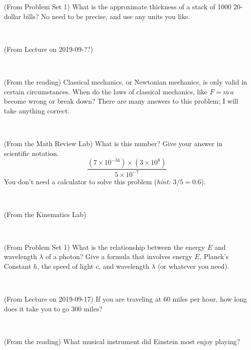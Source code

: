 \documentclass[12pt, letterpaper]{article}
\begin{document}
\begin{problem} (From Problem Set 1)
What is the approximate thickness of a stack of 1000 20-dollar bills?
No need to be precise, and use any units you like.
\end{problem}


\vfill ~

\begin{problem} (From Lecture on 2019-09-??)
\end{problem}


\vfill ~

\begin{problem} (From the reading)
Classical mechanics, or Newtonian mechanics, is only valid in certain
circumstances. When do the laws of classical mechanics, like $F =
m\,a$ become wrong or break down? There are many answers to this
problem; I will take anything correct.
\end{problem}


\vfill ~

\begin{problem} (From the Math Review Lab)
What is this number? Give your answer in scientific notation.
$$
\frac{(7\times10^{-34})\times(3\times10^8)}{5\times10^{-7}}
$$
You don't need a calculator to solve this problem (\textit{hint: $3/5=0.6$}).
\end{problem}


\vfill ~


\clearpage


\begin{problem} (From the Kinematics Lab)

\end{problem}


\vfill ~

\begin{problem} (From Problem Set 1)
What is the relationship between the energy $E$ and wavelength
$\lambda$ of a photon? Give a formula that involves energy $E$,
Planck's Constant $h$, the speed of light $c$, and wavelength
$\lambda$ (or whatever you need).
\end{problem}

\vfill ~

\begin{problem} (From Lecture on 2019-09-17)
If you are traveling at 60 miles per hour, how long does
it take you to go 300 miles?
\end{problem}


\vfill ~

\begin{problem} (From the reading)
What musical instrument did Einstein most enjoy playing?
\end{problem}
\end{document}
